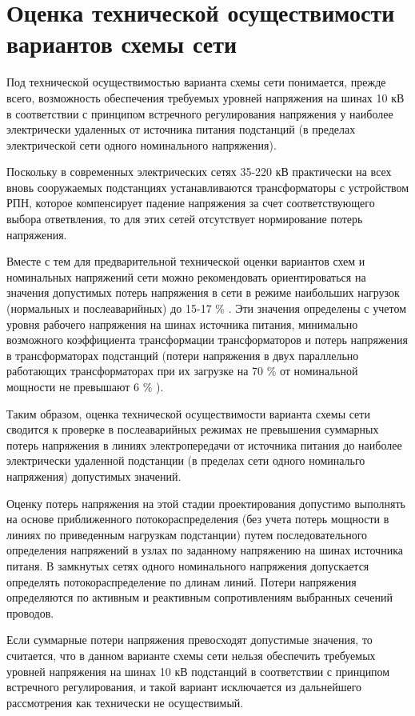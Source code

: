 \chapter{Оценка технической осуществимости вариантов схемы сети}
\label{cha:proverka_osush}

Под технической осуществимостью варианта схемы сети понимается, прежде всего, возможность обеспечения требуемых уровней напряжения на шинах 10 кВ в соответствии с принципом встречного регулирования напряжения у наиболее электрически удаленных от источника питания подстанций (в пределах электрической сети одного номинального напряжения).

Поскольку в современных электрических сетях 35-220 кВ практически на всех вновь сооружаемых подстанциях устанавливаются трансформаторы с устройством РПН, которое компенсирует падение напряжения за счет соответствующего выбора ответвления, то для этих сетей отсутствует нормирование потерь напряжения.

Вместе с тем для предварительной технической оценки вариантов схем и номинальных напряжений сети можно рекомендовать ориентироваться на значения допустимых потерь напряжения в сети в режиме наибольших нагрузок (нормальных и послеаварийных) до 15-17 \% \cite{глазунов_шведов}. Эти значения определены с учетом уровня рабочего напряжения на шинах источника питания, минимально возможного коэффициента трансформации трансформаторов и потерь напряжения в трансформаторах подстанций (потери напряжения в двух параллельно работающих трансформаторах при их загрузке на 70 \% от номинальной мощности не превышают 6 \% \cite{глазунов_шведов}).

Таким образом, оценка технической осуществимости варианта схемы сети сводится к проверке в послеаварийных режимах не превышения суммарных потерь напряжения в линиях электропередачи от источника питания до наиболее электрически удаленной подстанции (в пределах сети одного номинальго напряжения) допустимых значений.

Оценку потерь напряжения на этой стадии проектирования допустимо выполнять на основе приближенного потокораспределения (без учета потерь мощности в линиях по приведенным нагрузкам подстанции) путем последовательного определения напряжений в узлах по заданному напряжению на шинах источника питаня. В замкнутых сетях одного номинального напряжения допускается определять потокораспределение по длинам линий. Потери напряжения определяются по активным и реактивным сопротивлениям выбранных сечений проводов.

Если суммарные потери напряжения превосходят допустимые значения, то считается, что в данном варианте схемы сети нельзя обеспечить требуемых уровней напряжения на шинах 10 кВ подстанций в соответствии с принципом встречного регулирования, и такой вариант исключается из дальнейшего рассмотрения как технически не осуществимый.

